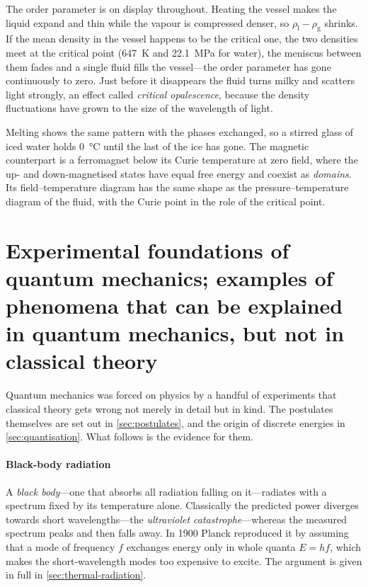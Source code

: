         The order parameter is on display throughout. Heating the vessel makes the liquid expand and thin while the vapour is compressed denser, so $\rho_{\mathrm{l}} - \rho_{\mathrm{g}}$ shrinks. If the mean density in the vessel happens to be the critical one, the two densities meet at the critical point (\qty{647}{\kelvin} and \qty{22.1}{\mega\pascal} for water), the meniscus between them fades and a single fluid fills the vessel---the order parameter has gone continuously to zero. Just before it disappears the fluid turns milky and scatters light strongly, an effect called \emph{critical opalescence}, because the density fluctuations have grown to the size of the wavelength of light.

        Melting shows the same pattern with the phases exchanged, so a stirred glass of iced water holds \qty{0}{\celsius} until the last of the ice has gone. The magnetic counterpart is a ferromagnet below its Curie temperature at zero field, where the up- and down-magnetised states have equal free energy and coexist as \emph{domains}. Its field--temperature diagram has the same shape as the pressure--temperature diagram of the fluid, with the Curie point in the role of the critical point.

\section{Experimental foundations of quantum mechanics; examples of phenomena that can be explained in quantum mechanics, but not in classical theory}
\label{sec:qm-experimental}

    Quantum mechanics was forced on physics by a handful of experiments that classical theory gets wrong not merely in detail but in kind. The postulates themselves are set out in \cref{sec:postulates}, and the origin of discrete energies in \cref{sec:quantisation}. What follows is the evidence for them.

    \paragraph{Black-body radiation}

    A \emph{black body}---one that absorbs all radiation falling on it---radiates with a spectrum fixed by its temperature alone. Classically the predicted power diverges towards short wavelengths---the \emph{ultraviolet catastrophe}---whereas the measured spectrum peaks and then falls away. In 1900 Planck reproduced it by assuming that a mode of frequency $f$ exchanges energy only in whole quanta $E = hf$, which makes the short-wavelength modes too expensive to excite. The argument is given in full in \cref{sec:thermal-radiation}.

